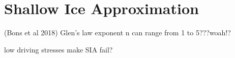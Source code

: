 \chapter{Shallow Ice Approximation}
(Bons et al 2018)
Glen's law exponent n can range from 1 to 5???woah!?


low driving stresses make SIA fail?








